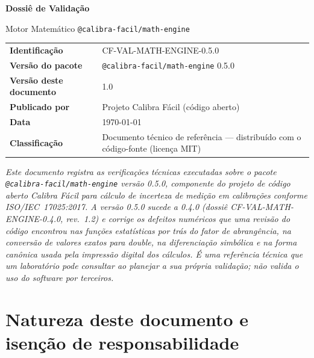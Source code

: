 \documentclass[11pt,a4paper]{article}
\makeatletter
\newcommand{\docTitle}{Dossiê de Validação}
\newcommand{\docSubject}{Motor Matemático \texttt{@calibra-facil/math-engine}}
\newcommand{\docVersion}{0.5.0}
\newcommand{\docRevision}{1.0}
\newcommand{\docId}{CF-VAL-MATH-ENGINE-0.5.0}
\newcommand{\docDate}{\today}
\newcommand{\organizationName}{Projeto Calibra Fácil}
\newcommand{\previousVersion}{0.4.0}
\makeatother
\begin{document}
\begin{titlepage}
  \begin{center}
    \vspace*{1.5cm}
    {\Huge\bfseries \docTitle\par}
    \vspace{0.4cm}
    {\Large \docSubject\par}
    \vspace{2.5cm}
    \begin{tabularx}{0.85\textwidth}{l X}
      \toprule
      \textbf{Identificação} & \docId \\
      \textbf{Versão do pacote} & \texttt{@calibra-facil/math-engine} \docVersion \\
      \textbf{Versão deste documento} & \docRevision{} \\
      \textbf{Publicado por} & \organizationName{} (código aberto) \\
      \textbf{Data} & \docDate \\
      \textbf{Classificação} & Documento técnico de referência --- distribuído com o código-fonte (licença MIT) \\
      \bottomrule
    \end{tabularx}
    \vfill
    \begin{minipage}{0.85\textwidth}
      \small\itshape
      Este documento registra as verificações técnicas executadas sobre o pacote \texttt{@calibra-facil/math-engine} versão \docVersion{}, componente do projeto de código aberto Calibra Fácil para cálculo de incerteza de medição em calibrações conforme \mbox{ISO/IEC 17025:2017}. A versão \docVersion{} sucede a \previousVersion{} (dossiê CF-VAL-MATH-ENGINE-0.4.0, rev.\ 1.2) e corrige os defeitos numéricos que uma revisão do código encontrou nas funções estatísticas por trás do fator de abrangência, na conversão de valores exatos para \emph{double}, na diferenciação simbólica e na forma canônica usada pela impressão digital dos cálculos. É uma referência técnica que um laboratório pode consultar ao planejar a sua própria validação; não valida o uso do software por terceiros.
    \end{minipage}
  \end{center}
\end{titlepage}

\section*{Natureza deste documento e isenção de responsabilidade}
\end{document}
